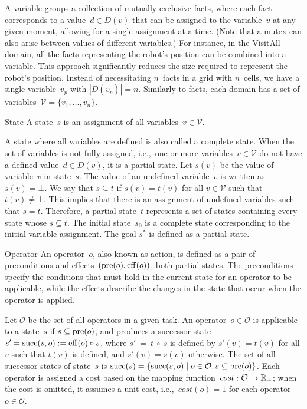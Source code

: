 A variable groups a collection of mutually exclusive facts, where each fact corresponds to a value~$d \in D(v)$ that can be assigned to the variable~$v$ at any given moment, allowing for a single assignment at a time. (Note that a mutex can also arise between values of different variables.) For instance, in the VisitAll domain, all the facts representing the robot's position can be combined into a variable. This approach significantly reduces the size required to represent the robot's position. Instead of necessitating $n$~facts in a grid with $n$~cells, we have a single variable~$v_p$ with $|D(v_p)| = n$. Similarly to facts, each domain has a set of variables~$\mathcal{V} = \{v_1,\ldots,v_n\}$.

\begin{definition}{State}
    \label{def:state}
    A state~$s$ is an assignment of all variables~$v \in \mathcal{V}$.
\end{definition}

A state where all variables are defined is also called a complete state. When the set of variables is not fully assigned, i.e.,~one or more variables~$v \in \mathcal{V}$ do not have a defined value~$d \in D(v)$, it is a partial state. Let $s(v)$ be the value of variable~$v$ in state~$s$. The value of an undefined variable~$v$ is written as~$s(v) = \bot$. We say that $s \subseteq t$ if $s(v) = t(v)$ for all $v \in \mathcal{V}$ such that $t(v) \neq \bot$. This implies that there is an assignment of undefined variables such that $s = t$. Therefore, a partial state~$t$ represents a set of states containing every state whose $s \subseteq t$. The initial state~$s_0$ is a complete state corresponding to the initial variable assignment. The goal $s^*$ is defined as a partial state.

\begin{definition}{Operator}
    \label{def:operator}
    An operator~$o$, also known as action, is defined as a pair of preconditions and effects~$(\operatorname{pre}(o),\operatorname{eff}(o))$, both partial states. The preconditions specify the conditions that must hold in the current state for an operator to be applicable, while the effects describe the changes in the state that occur when the operator is applied.
\end{definition}

Let $\mathcal{O}$ be the set of all operators in a given task. An operator~$o \in \mathcal{O}$ is applicable to a state~$s$ if $s \subseteq \operatorname{pre}(o)$, and produces a successor state~$s' = \operatorname{succ}(s,o) := \operatorname{eff}(o) \circ s$, where $s'~=~t~\circ~s$ is defined by $s'(v) = t(v)$ for all $v$ such that $t(v)$ is defined, and $s'(v)=s(v)$ otherwise. The set of all successor states of state~$s$ is $\operatorname{succ}(s) = \{\operatorname{succ}(s,o) \mid o \in \mathcal{O}, s \subseteq \operatorname{pre}(o)\}$. Each operator is assigned a cost based on the mapping function~$cost:\mathcal{O}\rightarrow\mathbb{R}_{+}$; when the cost is omitted, it assumes a unit cost, i.e.,~$cost(o) = 1$ for each operator~$o \in \mathcal{O}$.

